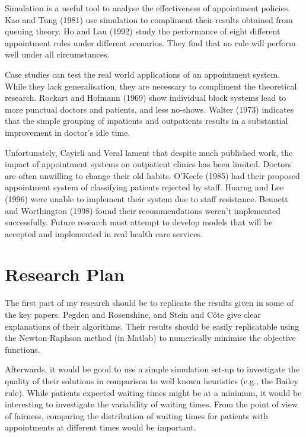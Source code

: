 \documentclass{article}
\begin{document}
Simulation is a useful tool to analyse the effectiveness of appointment policies. Kao and Tung (1981) \cite{Kao} use simulation to compliment their results obtained from queuing theory. Ho and Lau (1992) \cite{Ho} study the performance of eight different appointment rules under different scenarios. They find that no rule will perform well under all circumstances.

Case studies can test the real world applications of an appointment system. While they lack generalisation, they are necessary to compliment the theoretical research. Rockart and Hofmann (1969) \cite{Rockart} show individual block systems lead to more punctual doctors and patients, and less no-shows. Walter (1973) \cite{Walter} indicates that the simple grouping of inpatients and outpatients results in a substantial improvement in doctor's idle time.

Unfortunately, Cayirli and Veral lament that despite much published work, the impact of appointment systems on outpatient clinics has been limited. Doctors are often unwilling to change their old habits. O'Keefe (1985) \cite{O'Keefe} had their proposed appointment system of classifying patients rejected by staff. Huarng and Lee (1996) \cite{Huarng} were unable to implement their system due to staff resistance. Bennett and Worthington (1998) \cite{Bennett} found their recommendations weren't implemented successfully. Future research must attempt to develop models that will be accepted and implemented in real health care services.

\section{Research Plan}

The first part of my research should be to replicate the results given in some of the key papers. Pegden and Rosenshine, and Stein and C\^{o}te give clear explanations of their algorithms. Their results should be easily replicatable using the Newton-Raphson method (in Matlab) to numerically minimise the objective functions.

Afterwards, it would be good to use a simple simulation set-up to investigate the quality of their solutions in comparison to well known heuristics (e.g., the Bailey rule). While patients expected waiting times might be at a minimum, it would be interesting to investigate the variability of waiting times. From the point of view of fairness, comparing the distribution of waiting times for patients with appointments at different times would be important.
\end{document}
